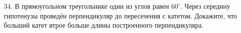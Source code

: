 34. В прямоугольном треугольнике один из углов равен $60^\circ.$ Через середину гипотенузы проведён перпендикуляр до пересечения с катетом. Докажите, что больший катет втрое больше длины построенного перпендикуляра.\\

